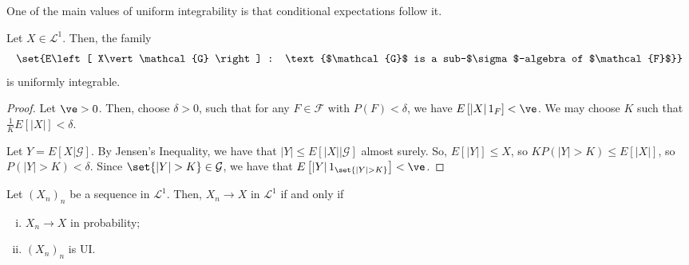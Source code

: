 \documentclass[10pt]{mypackage}
\begin{document}
One of the main values of uniform integrability is that conditional expectations follow it.
\begin{theorem}
  Let $X\in \mathcal{L}^1$. Then, the family
  \begin{align*}
    \set{E\left[ X\vert\mathcal{G} \right] : \text{$\mathcal{G}$ is a sub-$\sigma$-algebra of $\mathcal{F}$}}
  \end{align*}
  is uniformly integrable.
\end{theorem}
\begin{proof}
  Let $\ve > 0$. Then, choose $\delta > 0$, such that for any $F\in \mathcal{F}$ with $P(F) < \delta$, we have $E\left[ \left\vert X \right\vert1_{F} \right] < \ve$. We may choose $K$ such that $\frac{1}{K}E\left[ \left\vert X \right\vert \right] < \delta$.

  Let $Y = E\left[ X|\mathcal{G} \right]$. By Jensen's Inequality, we have that $\left\vert Y \right\vert\leq E\left[ \left\vert X \right\vert|\mathcal{G} \right]$ almost surely. So, $E\left[ \left\vert Y \right\vert \right] \leq X$, so $KP\left( \left\vert Y \right\vert > K \right)\leq E\left[ \left\vert X \right\vert \right]$, so $P\left( \left\vert Y \right\vert > K \right) < \delta$. Since $\set{\left\vert Y \right\vert > K}\in \mathcal{G}$, we have that $E\left[ \left\vert Y \right\vert1_{\set{\left\vert Y \right\vert > K}} \right] < \ve$.
\end{proof}
\begin{theorem}
  Let $\left( X_n \right)_{n}$ be a sequence in $ \mathcal{L}^1 $. Then, $X_n\to X$ in $\mathcal{L}^1$ if and only if
  \begin{enumerate}[(i)]
    \item $X_n\to X$ in probability;
    \item $\left( X_n \right)_{n}$ is UI.
  \end{enumerate}
\end{theorem}
\end{document}
